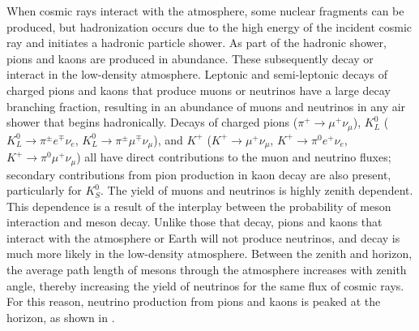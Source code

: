 When cosmic rays interact with the atmosphere, some nuclear fragments can be produced, but hadronization occurs due to the high energy of the incident cosmic ray and initiates a hadronic particle shower.
As part of the hadronic shower, pions and kaons are produced in abundance.
These subsequently decay or interact in the low-density atmosphere.
Leptonic and semi-leptonic decays of charged pions and kaons that produce muons or neutrinos have a large decay branching fraction, resulting in an abundance of muons and neutrinos in any air shower that begins hadronically.
Decays of charged pions
($\pi^+\rightarrow\mu^+\nu_\mu$), 
$K_L^0$ ($K_L^0 \rightarrow \pi^\pm e^\mp \nu_e$, $K_L^0 \rightarrow \pi^\pm \mu^\mp \nu_\mu$), and 
$K^+$ ($K^+\rightarrow \mu^+ \nu_\mu$, $K^+\rightarrow \pi^0 e^+ \nu_e$, $K^+\rightarrow \pi^0 \mu^+ \nu_\mu$) 
all have direct contributions to the muon and neutrino fluxes; secondary contributions from pion production in kaon decay are also present, particularly for $K_S^0$.
The yield of muons and neutrinos is highly zenith dependent.
This dependence is a result of the interplay between the probability of meson interaction and meson decay.
Unlike those that decay, pions and kaons that interact with the atmosphere or Earth will not produce neutrinos, and decay is much more likely in the low-density atmosphere.
Between the zenith and horizon, the average path length of mesons through the atmosphere increases with zenith angle, thereby increasing the yield of neutrinos for the same flux of cosmic rays.
For this reason, neutrino production from pions and kaons is peaked at the horizon, as shown in .

